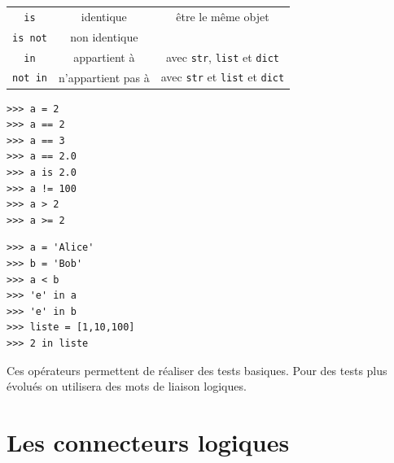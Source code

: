 {\begin{tabular}{CCC}
	\texttt{is}                                      & identique                             & être le même objet                                                                                    \\

	\texttt{is not}                                  & non identique                         &                                                                                                       \\

	\texttt{in}                                      & appartient à                          & avec \texttt{str}, \texttt{list} et \texttt{dict}                                   \\

	\texttt{not in}                                  & n'appartient pas à                    & avec \texttt{str} et \texttt{list} et \texttt{dict}                                 \\
\end{tabular}
}\normalsize

\begin{pys}
	\begin{verbatim}
>>> a = 2
>>> a == 2
>>> a == 3
>>> a == 2.0
>>> a is 2.0
>>> a != 100
>>> a > 2
>>> a >= 2
    \end{verbatim}
\end{pys}

\begin{pys}
	\begin{verbatim}
>>> a = 'Alice'
>>> b = 'Bob'
>>> a < b
>>> 'e' in a
>>> 'e' in b
>>> liste = [1,10,100]
>>> 2 in liste
    \end{verbatim}
\end{pys}

Ces opérateurs permettent de réaliser des tests basiques. Pour des tests plus évolués on utilisera des \og mots de liaison \fg{} logiques.

\section{Les connecteurs logiques}


